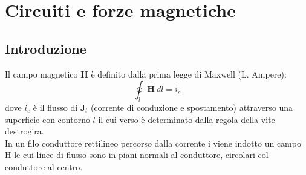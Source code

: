 \documentclass{article}
\begin{document}
\section{Circuiti e forze magnetiche}
\subsection{Introduzione}
Il campo magnetico $\mathbf{H}$ è definito dalla prima
legge di Maxwell (L. Ampere):
\[\oint_l \mathbf{H} \ dl = i_c\]
dove $i_c$ è il flusso di $\mathbf{J}_t$ (corrente di conduzione e spostamento) attraverso una superficie con contorno $l$ il cui verso è determinato dalla regola della vite destrogira.\\
In un filo conduttore rettilineo percorso
dalla corrente i viene indotto un campo H
le cui linee di flusso sono in piani normali al
conduttore, circolari col conduttore al
centro. 
\end{document}
